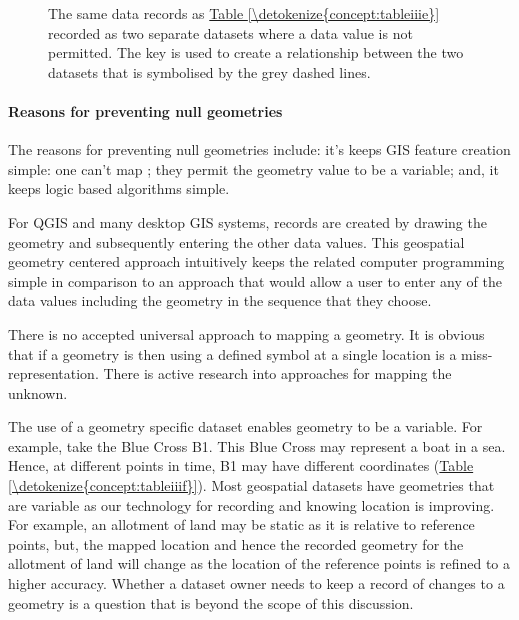 \documentclass[letterpaper,10pt,english]{sphinxmanual}
\begin{document}
\begin{figure}[htbp]
\centering
\capstart

\noindent{}
\caption{The same data records as \hyperref[\detokenize{concept:tableiiie}]{Table \ref{\detokenize{concept:tableiiie}}} recorded as two separate datasets where a   data value is not permitted.  The  key is used to create a relationship between the two datasets that is symbolised by the grey dashed lines.}\label{\detokenize{concept:id50}}\label{\detokenize{concept:figurejoinedcrosses}}\end{figure}


\paragraph{Reasons for preventing null geometries}
\label{\detokenize{concept:reasons-for-preventing-null-geometries}}
The reasons for preventing null geometries include: it’s keeps GIS feature creation simple: one can’t map ; they permit the geometry value to be a variable; and, it keeps logic based algorithms simple.

For QGIS and many desktop GIS systems, records are created by drawing the geometry and subsequently entering the other data values.  This geospatial geometry centered approach intuitively keeps the related computer programming simple in comparison to an approach that would allow a user to enter any of the data values including the geometry in the sequence that they choose.

There is no accepted universal approach to mapping a  geometry.  It is obvious that if a geometry is  then using a defined symbol at a single location is a miss-representation.  There is active research into approaches for mapping the unknown.

The use of a geometry specific dataset enables geometry to be a variable.  For example, take the Blue Cross B1.  This Blue Cross may represent a boat in a sea.  Hence, at different points in time, B1 may have different coordinates (\hyperref[\detokenize{concept:tableiiif}]{Table \ref{\detokenize{concept:tableiiif}}}).  Most geospatial datasets have geometries that are variable as our technology for recording and knowing location is improving.  For example, an allotment of land may be static as it is relative to reference points, but, the mapped location and hence the recorded geometry for the allotment of land will change as the location of the reference points is refined to a higher accuracy.  Whether a dataset owner needs to keep a record of changes to a geometry is a question that is beyond the scope of this discussion.
\end{document}
